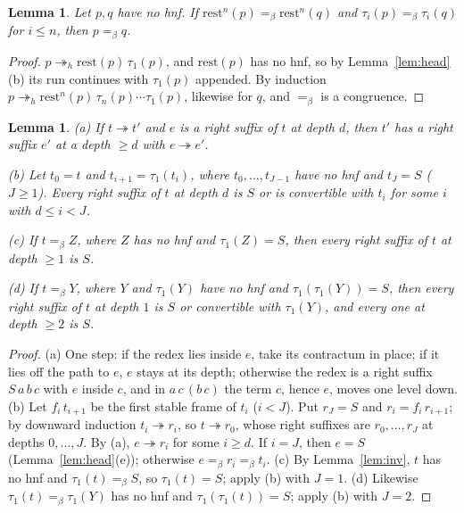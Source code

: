 \documentclass[11pt]{amsart}
\newtheorem{lemma}[theorem]{Lemma}
\theoremstyle{definition}
\newcommand{\red}{\twoheadrightarrow}
\newcommand{\hred}{\twoheadrightarrow_h}
\newcommand{\conv}{=_\beta}
\newcommand{\rest}{\mathrm{rest}}
\begin{document}
\begin{lemma}\label{lem:finite}
Let $p,q$ have no hnf. If $\rest^n(p)\conv\rest^n(q)$ and $\tau_i(p)\conv\tau_i(q)$ for $i\le n$,
then $p\conv q$.
\end{lemma}

\begin{proof}
$p\hred\rest(p)\,\tau_1(p)$, and $\rest(p)$ has no hnf, so by Lemma~\ref{lem:head}(b) its run
continues with $\tau_1(p)$ appended. By induction $p\hred\rest^n(p)\,\tau_n(p)\cdots\tau_1(p)$, likewise
for $q$, and $\conv$ is a congruence.
\end{proof}

\begin{lemma}\label{lem:suffix}
\textup{(a)} If $t\red t'$ and $e$ is a right suffix of $t$ at depth $d$, then $t'$ has a right
suffix $e'$ at a depth $\ge d$ with $e\red e'$.

\textup{(b)} Let $t_0=t$ and $t_{i+1}=\tau_1(t_i)$, where $t_0,\dots,t_{J-1}$ have no hnf and
$t_J=S$ \textup{(}$J\ge1$\textup{)}. Every right suffix of $t$ at depth $d$ is $S$ or is convertible
with $t_i$ for some $i$ with $d\le i<J$.

\textup{(c)} If $t\conv Z$, where $Z$ has no hnf and $\tau_1(Z)=S$, then every right suffix of $t$
at depth $\ge1$ is $S$.

\textup{(d)} If $t\conv Y$, where $Y$ and $\tau_1(Y)$ have no hnf and $\tau_1(\tau_1(Y))=S$, then
every right suffix of $t$ at depth $1$ is $S$ or convertible with $\tau_1(Y)$, and every one at
depth $\ge2$ is $S$.
\end{lemma}

\begin{proof}
(a) One step: if the redex lies inside $e$, take its contractum in place; if it lies off the path
to $e$, $e$ stays at its depth; otherwise the redex is a right suffix $S\,a\,b\,c$ with $e$ inside
$c$, and in $a\,c\,(b\,c)$ the term $c$, hence $e$, moves one level down.
(b) Let $f_i\,t_{i+1}$ be the first stable frame of $t_i$ ($i<J$). Put $r_J=S$ and
$r_i=f_i\,r_{i+1}$; by downward induction $t_i\red r_i$, so $t\red r_0$, whose right suffixes are
$r_0,\dots,r_J$ at depths $0,\dots,J$. By (a), $e\red r_{i}$ for some $i\ge d$. If $i=J$, then $e=S$
(Lemma~\ref{lem:head}(e)); otherwise $e\conv r_i\conv t_i$.
(c) By Lemma~\ref{lem:inv}, $t$ has no hnf and $\tau_1(t)\conv S$, so $\tau_1(t)=S$; apply (b) with
$J=1$. (d) Likewise $\tau_1(t)\conv\tau_1(Y)$ has no hnf and $\tau_1(\tau_1(t))=S$; apply (b) with
$J=2$.
\end{proof}
\end{document}
